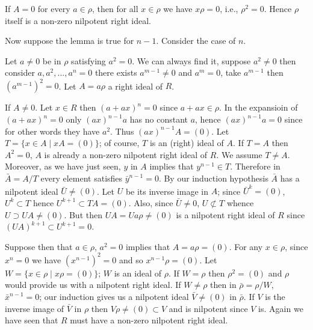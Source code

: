 \documentclass{article}
\begin{document}
\begin{tcolorbox}[colback=gray!20, colframe=black] 
If $A = 0$ for every $a \in \rho$, then for all $x \in \rho$ we have $x\rho = 0$, i.e., $\rho^2 = 0$. Hence $\rho$ itself is a non-zero nilpotent right ideal.  

Now suppose the lemma is true for $ n-1 $. Consider the case of $ n $.  

Let $a \neq 0$ be in $\rho$ satisfying $a^2 = 0$. We can always find it, suppose $ a^2 \neq 0 $ then consider $ a,a^2,\ldots, a^n=0 $ there exists $ a^{m-1} \neq 0 $ and $ a^m=0 $, take $ a^{m-1} $ then $ (a^{m-1})^2=0 $. Let $ A=a\rho $ a right ideal of $ R $.

If $ A \neq 0 $. Let $x \in R$ then $(a+ax)^n = 0$ since $a+ax \in \rho$. In the expansioin of $(a+ax)^n = 0$ only $ (ax)^{n-1}a $ has no constant $ a $, hence $ (ax)^{n-1}a=0  $ since for other words they have $ a^2 $. Thus $(ax)^{n-1}A = (0)$. Let $T = \{x \in A \mid xA = (0)\}$; of course, $T$ is an (right) ideal of $A$. If $ T=A $ then $ A^2=0 $, $ A $ is already a non-zero nilpotent right ideal of $ R $. We assume $ T \neq A $. Moreover, as we have just seen, $y$ in $A$ implies that $y^{n-1} \in T$. Therefore in $\bar{A} = A/T$ every element satisfies $\bar{y}^{n-1} = 0$. By our induction hypothesis $\bar{A}$ has a nilpotent ideal $\bar{U} \neq (0)$. Let $U$ be its inverse image in $A$; since $\bar{U}^k = (0)$, $U^k \subset T$ hence $U^{k+1} \subset TA = (0)$. Also, since $\bar{U} \neq 0$, $U \not\subset T$ whence $U \supset UA \neq (0)$. But then $UA = Ua\rho \neq (0)$ is a nilpotent right ideal of $R$ since $ (UA)^{k+1} \subset U^{k+1} =0  $.   

Suppose then that $a \in \rho$, $a^2 = 0$ implies that $A=a\rho = (0)$. For any $x \in \rho$, since $x^n = 0$ we have $(x^{n-1})^2 = 0$ and so $x^{n-1}\rho = (0)$. Let $W = \{x \in \rho \mid x\rho = (0)\}$; $W$ is an ideal of $\rho$. If $W = \rho$ then $\rho^2 = (0)$ and $\rho$ would provide us with a nilpotent right ideal. If $W \neq \rho$ then in $\bar{\rho} = \rho/W$, $\bar{x}^{n-1} = 0$; our induction gives us a nilpotent ideal $\bar{V} \neq (0)$ in $\bar{\rho}$. If $V$ is the inverse image of $\bar{V}$ in $\rho$ then $V\rho \neq (0) \subset V$ and is nilpotent since $V$ is. Again we have seen that $R$ must have a non-zero nilpotent right ideal.  
\end{tcolorbox}
\end{document}
